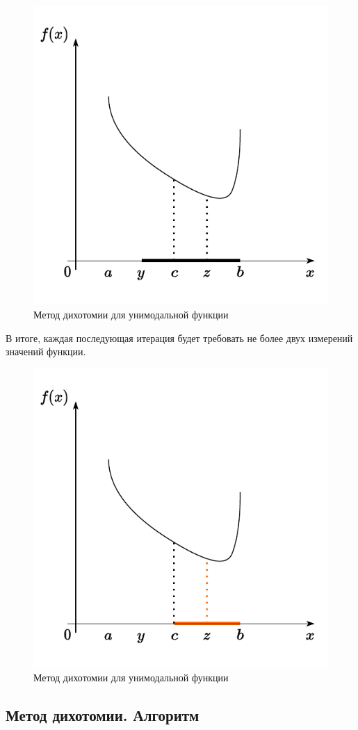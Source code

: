 \documentclass[
  russian,
  letterpaper,
  DIV=11,
  numbers=noendperiod]{scrartcl}
\begin{document}
\begin{figure}[H]

{\centering \includegraphics[width=0.4\linewidth,height=\textheight,keepaspectratio]{Dichotomy9.pdf}

}

\caption{Метод дихотомии для унимодальной функции}

\end{figure}%

В итоге, каждая последующая итерация будет требовать не более двух
измерений значений функции.

\begin{figure}[H]

{\centering \includegraphics[width=0.4\linewidth,height=\textheight,keepaspectratio]{Dichotomy10.pdf}

}

\caption{Метод дихотомии для унимодальной функции}

\end{figure}%

\subsection{Метод дихотомии.
Алгоритм}\label{ux43cux435ux442ux43eux434-ux434ux438ux445ux43eux442ux43eux43cux438ux438.-ux430ux43bux433ux43eux440ux438ux442ux43c}
\end{document}
